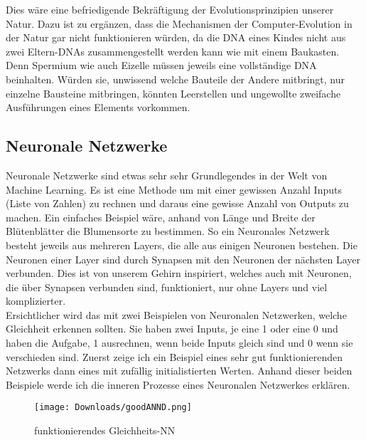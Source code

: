 \documentclass[11pt,a4paper,ngerman]{article}
\begin{document}
Dies wäre eine befriedigende Bekräftigung der Evolutionsprinzipien unserer Natur. Dazu ist zu ergänzen, dass die Mechanismen der Computer-Evolution in der Natur gar nicht funktionieren würden, da die DNA eines Kindes nicht aus zwei Eltern-DNAs zusammengestellt werden kann wie mit einem Baukasten. Denn Spermium wie auch Eizelle müssen jeweils eine vollständige DNA beinhalten. Würden sie, unwissend welche Bauteile der Andere mitbringt, nur einzelne Bausteine mitbringen, könnten Leerstellen und ungewollte zweifache Ausführungen eines Elements vorkommen.


\subsection{Neuronale Netzwerke}

Neuronale Netzwerke sind etwas sehr sehr Grundlegendes in der Welt von Machine Learning. Es ist eine Methode um mit einer gewissen Anzahl Inputs (Liste von Zahlen) zu rechnen und daraus eine gewisse Anzahl von Outputs zu machen. Ein einfaches Beispiel wäre, anhand von Länge und Breite der Blütenblätter die Blumensorte zu bestimmen. So ein Neuronales Netzwerk besteht jeweils aus mehreren Layers, die alle aus einigen Neuronen bestehen. Die Neuronen einer Layer sind durch Synapsen mit den Neuronen der nächsten Layer verbunden. Dies ist von unserem Gehirn inspiriert, welches auch mit Neuronen, die über Synapsen verbunden sind, funktioniert, nur ohne Layers und viel komplizierter.\\

Ersichtlicher wird das mit zwei Beispielen von Neuronalen Netzwerken, welche Gleichheit erkennen sollten. Sie haben zwei Inputs, je eine 1 oder eine 0 und haben die Aufgabe, 1 ausrechnen, wenn beide Inputs gleich sind und 0 wenn sie verschieden sind. Zuerst zeige ich ein Beispiel eines sehr gut funktionierenden Netzwerks dann eines mit zufällig initialistierten Werten. Anhand dieser beiden Beispiele werde ich die inneren Prozesse eines Neuronalen Netzwerkes erklären. 

\begin{figure}[h]
    \begin{center}
        \texttt{[image: Downloads/goodANND.png]}
        \caption{funktionierendes Gleichheits-NN}
    \end{center}
\end{figure}
\end{document}
